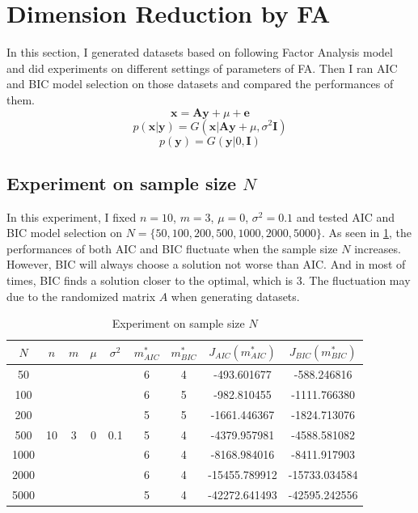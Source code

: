 \documentclass{article}
\begin{document}
\section{Dimension Reduction by FA}
\par
In this section, I generated datasets based on following Factor Analysis model and did experiments on different settings of parameters of FA. Then I ran AIC and BIC model selection on those datasets and compared the performances of them.
\begin{equation}
  \mathbf{x}=\mathbf{Ay}+\mu+\mathbf{e}
\end{equation}
\begin{equation}
  p(\mathbf{x}|\mathbf{y})=G(\mathbf{x}|\mathbf{Ay}+\mu,\sigma^2\mathbf{I})
\end{equation}
\begin{equation}
  p(\mathbf{y})=G(\mathbf{y}|0,\mathbf{I})
\end{equation}
\par
\subsection{Experiment on sample size $N$}
In this experiment, I fixed $n=10$, $m=3$, $\mu=0$, $\sigma^2=0.1$ and tested AIC and BIC model selection on $N=\{50, 100, 200, 500, 1000, 2000, 5000\}$.
As seen in \ref{N}, the performances of both AIC and BIC fluctuate when the sample size $N$ increases. However, BIC will always choose a solution not worse than AIC. And in most of times, BIC finds a solution closer to the optimal, which is 3.
The fluctuation may due to the randomized matrix $A$ when generating datasets.
\begin{table}[htbp]
	\centering
	\newcommand{\tabincell}[2]{\begin{tabular}{@{}#1@{}}#2\end{tabular}}
	\renewcommand\arraystretch{1.0}
	\caption{Experiment on sample size $N$}
	\label{N}%
	\begin{tabular}{c|c|c|c|c|c|c|c|c}
    $N$ & $n$ & $m$ & $\mu$ & $\sigma^2$ & $m^*_{AIC}$ & $m^*_{BIC}$ & $J_{AIC}(m^*_{AIC})$ &$J_{BIC}(m^*_{BIC})$\\
    \hline
		50 & \multirow{7}{*}{10} & \multirow{7}{*}{3} & \multirow{7}{*}{0} & \multirow{7}{*}{0.1} & 6 & 4 & -493.601677 & -588.246816\\
    100 & & & & & 6 & 5 & -982.810455 & -1111.766380\\
    200 & & & & & 5 & 5 & -1661.446367 & -1824.713076\\
    500 & & & & & 5 & 4 & -4379.957981 & -4588.581082\\
    1000 & & & & & 6 & 4 & -8168.984016 & -8411.917903\\
    2000 & & & & & 6 & 4 & -15455.789912 & -15733.034584\\
    5000 & & & & & 5 & 4 & -42272.641493 & -42595.242556\\
		\hline
\end{tabular}
\end{table}
\end{document}
